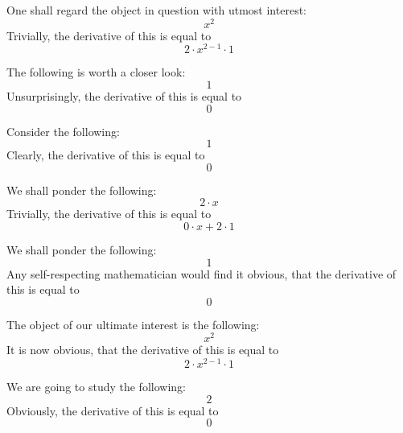 \documentclass{article}
\begin{document}
One shall regard the object in question with utmost interest:
\begin{equation}
x ^{2 } 
\end{equation}
Trivially, the derivative of this is equal to
\begin{equation}
2 \cdot x ^{2 - 1 } \cdot 1 
\end{equation}

The following is worth a closer look:
\begin{equation}
1 
\end{equation}
Unsurprisingly, the derivative of this is equal to
\begin{equation}
0 
\end{equation}

Consider the following:
\begin{equation}
1 
\end{equation}
Clearly, the derivative of this is equal to
\begin{equation}
0 
\end{equation}

We shall ponder the following:
\begin{equation}
2 \cdot x 
\end{equation}
Trivially, the derivative of this is equal to
\begin{equation}
0 \cdot x + 2 \cdot 1 
\end{equation}

We shall ponder the following:
\begin{equation}
1 
\end{equation}
Any self-respecting mathematician would find it obvious, that the derivative of this is equal to
\begin{equation}
0 
\end{equation}

The object of our ultimate interest is the following:
\begin{equation}
x ^{2 } 
\end{equation}
It is now obvious, that the derivative of this is equal to
\begin{equation}
2 \cdot x ^{2 - 1 } \cdot 1 
\end{equation}

We are going to study the following:
\begin{equation}
2 
\end{equation}
Obviously, the derivative of this is equal to
\begin{equation}
0 
\end{equation}
\end{document}
